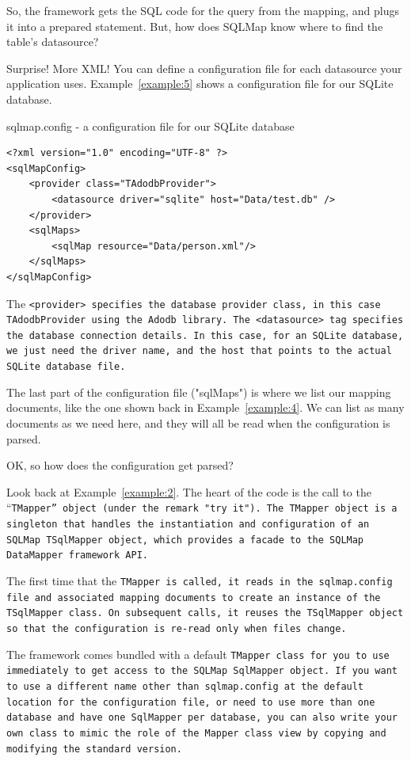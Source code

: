 So, the framework gets the SQL code for the query from the mapping, and plugs
it into a prepared statement. But, how does SQLMap know where to find the
table's datasource?

Surprise! More XML! You can define a configuration file for each datasource
your application uses. Example~\ref{example:5} shows a configuration file for
our SQLite database.

\begin{example}\label{example:5}
sqlmap.config - a configuration file for our SQLite database
\begin{verbatim}
<?xml version="1.0" encoding="UTF-8" ?>
<sqlMapConfig>
    <provider class="TAdodbProvider">
        <datasource driver="sqlite" host="Data/test.db" />
    </provider>
    <sqlMaps>
        <sqlMap resource="Data/person.xml"/>
    </sqlMaps>
</sqlMapConfig>
\end{verbatim}
\end{example}

The \tt{<provider>} specifies the database provider class, in this case
\tt{TAdodbProvider} using the Adodb library. The \tt{<datasource>} tag
specifies the database connection details. In this case, for an SQLite
database, we just need the driver name, and the host that points to the actual
SQLite database file.

The last part of the configuration file ("sqlMaps") is where we list our
mapping documents, like the one shown back in Example~\ref{example:4}. We can
list as many documents as we need here, and they will all be read when the
configuration is parsed.

OK, so how does the configuration get parsed?

Look back at Example~\ref{example:2}. The heart of the code is the call to the
``\tt{TMapper}'' object (under the remark "try it"). The \tt{TMapper} object
is a singleton that handles the instantiation and configuration of an SQLMap
\tt{TSqlMapper} object, which provides a facade to the SQLMap DataMapper
framework API.

The first time that the \tt{TMapper} is called, it reads in the
\tt{sqlmap.config} file and associated mapping documents to create an instance
of the \tt{TSqlMapper} class. On subsequent calls, it reuses the
\tt{TSqlMapper} object so that the configuration is re-read only when files
change.

The framework comes bundled with a default \tt{TMapper} class for you to use
immediately to get access to the SQLMap SqlMapper object. If you want to use a
different name other than \tt{sqlmap.config} at the default location for the
configuration file, or need to use more than one database and have one
SqlMapper per database, you can also write your own class to mimic the role of
the Mapper class view by copying and modifying the standard version.

